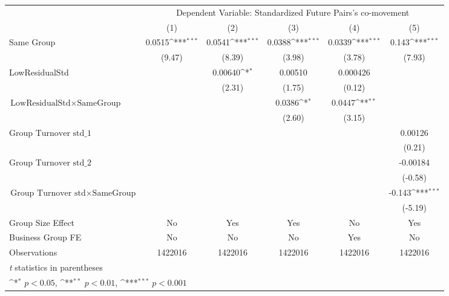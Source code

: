 {
\def\sym#1{\ifmmode^{#1}\else\(^{#1}\)\fi}
\begin{tabular}{l*{5}{c}}
\hline\hline
                &\multicolumn{5}{c}{Dependent Variable: Standardized Future Pairs's co-movement}               \\\cmidrule(lr){2-6}
                &\multicolumn{1}{c}{(1)}         &\multicolumn{1}{c}{(2)}         &\multicolumn{1}{c}{(3)}         &\multicolumn{1}{c}{(4)}         &\multicolumn{1}{c}{(5)}         \\
\hline
Same Group      &   0.0515\sym{***}&   0.0541\sym{***}&   0.0388\sym{***}&   0.0339\sym{***}&    0.143\sym{***}\\
                &   (9.47)         &   (8.39)         &   (3.98)         &   (3.78)         &   (7.93)         \\
[1em]
LowResidualStd  &                  &  0.00640\sym{*}  &  0.00510         & 0.000426         &                  \\
                &                  &   (2.31)         &   (1.75)         &   (0.12)         &                  \\
[1em]
$ {\text{LowResidualStd} } \times {\text{SameGroup} }  $ &                  &                  &   0.0386\sym{*}  &   0.0447\sym{**} &                  \\
                &                  &                  &   (2.60)         &   (3.15)         &                  \\
[1em]
 $ {\text{Group Turnover std}\_1} $ &                  &                  &                  &                  &  0.00126         \\
                &                  &                  &                  &                  &   (0.21)         \\
[1em]
 $ {\text{Group Turnover std}\_2} $ &                  &                  &                  &                  & -0.00184         \\
                &                  &                  &                  &                  &  (-0.58)         \\
[1em]
$ {\text{Group Turnover std} } \times {\text{SameGroup} }  $ &                  &                  &                  &                  &   -0.143\sym{***}\\
                &                  &                  &                  &                  &  (-5.19)         \\
\hline
Group Size Effect&       No         &      Yes         &      Yes         &       No         &      Yes         \\
Business Group FE&       No         &       No         &       No         &      Yes         &       No         \\
Observations    &  1422016         &  1422016         &  1422016         &  1422016         &  1422016         \\
\hline\hline
\multicolumn{6}{l}{\footnotesize \textit{t} statistics in parentheses}\\
\multicolumn{6}{l}{\footnotesize \sym{*} \(p<0.05\), \sym{**} \(p<0.01\), \sym{***} \(p<0.001\)}\\
\end{tabular}
}
